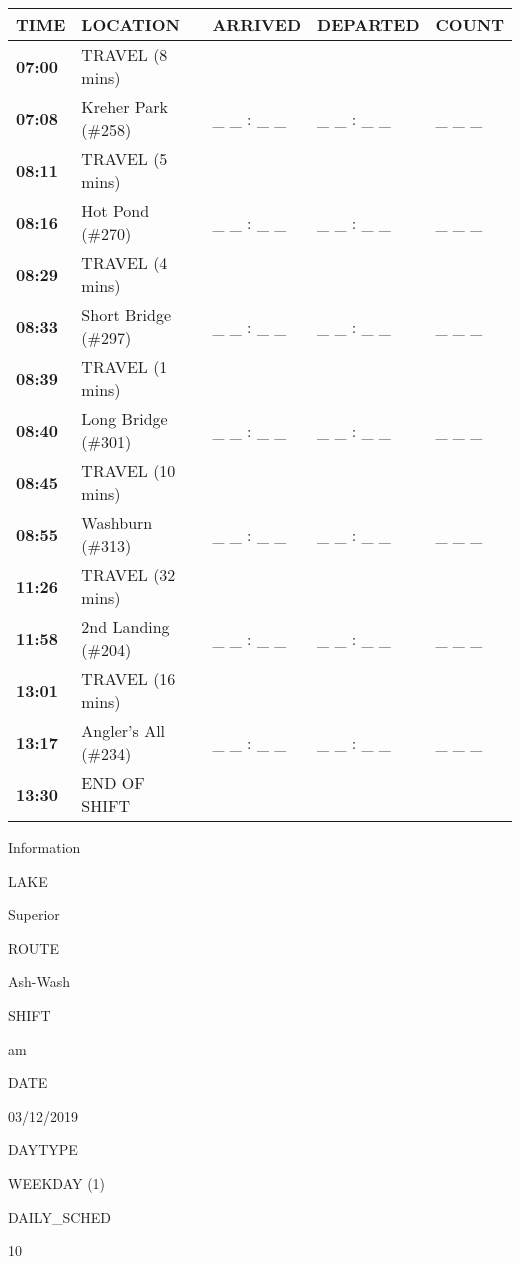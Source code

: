 \documentclass[]{article}
\begin{document}
\begin{tabular}{>{\bfseries}lllll}
\toprule
\textbf{TIME} & \textbf{LOCATION} & \textbf{ARRIVED} & \textbf{DEPARTED} & \textbf{COUNT}\\
\midrule
07:00 & TRAVEL (8 mins) &  &  & \\
07:08 & Kreher Park (\#258) & \_ \_ : \_ \_ & \_ \_ : \_ \_ & \_ \_ \_\\
08:11 & TRAVEL (5 mins) &  &  & \\
08:16 & Hot Pond (\#270) & \_ \_ : \_ \_ & \_ \_ : \_ \_ & \_ \_ \_\\
08:29 & TRAVEL (4 mins) &  &  & \\
08:33 & Short Bridge (\#297) & \_ \_ : \_ \_ & \_ \_ : \_ \_ & \_ \_ \_\\
08:39 & TRAVEL (1 mins) &  &  & \\
08:40 & Long Bridge (\#301) & \_ \_ : \_ \_ & \_ \_ : \_ \_ & \_ \_ \_\\
08:45 & TRAVEL (10 mins) &  &  & \\
08:55 & Washburn (\#313) & \_ \_ : \_ \_ & \_ \_ : \_ \_ & \_ \_ \_\\
11:26 & TRAVEL (32 mins) &  &  & \\
11:58 & 2nd Landing (\#204) & \_ \_ : \_ \_ & \_ \_ : \_ \_ & \_ \_ \_\\
13:01 & TRAVEL (16 mins) &  &  & \\
13:17 & Angler's All (\#234) & \_ \_ : \_ \_ & \_ \_ : \_ \_ & \_ \_ \_\\
13:30 & END OF SHIFT &  &  & \\
\bottomrule
\end{tabular}\newpage

Information

LAKE

Superior

ROUTE

Ash-Wash

SHIFT

am

DATE

03/12/2019

DAYTYPE

WEEKDAY (1)

DAILY\_SCHED

10

\vspace{24pt}
\end{document}
